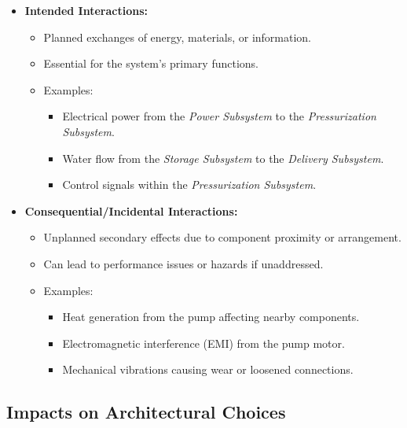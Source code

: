 \documentclass[12pt]{report}
\begin{document}
\begin{itemize}
    \item \textbf{Intended Interactions:}
    \begin{itemize}
        \item Planned exchanges of energy, materials, or information.
        \item Essential for the system's primary functions.
        \item Examples:
        \begin{itemize}
            \item Electrical power from the \textit{Power Subsystem} to the \textit{Pressurization Subsystem}.
            \item Water flow from the \textit{Storage Subsystem} to the \textit{Delivery Subsystem}.
            \item Control signals within the \textit{Pressurization Subsystem}.
        \end{itemize}
    \end{itemize}
    \item \textbf{Consequential/Incidental Interactions:}
    \begin{itemize}
        \item Unplanned secondary effects due to component proximity or arrangement.
        \item Can lead to performance issues or hazards if unaddressed.
        \item Examples:
        \begin{itemize}
            \item Heat generation from the pump affecting nearby components.
            \item Electromagnetic interference (EMI) from the pump motor.
            \item Mechanical vibrations causing wear or loosened connections.
        \end{itemize}
    \end{itemize}
\end{itemize}

\subsection{Impacts on Architectural Choices}
\end{document}
